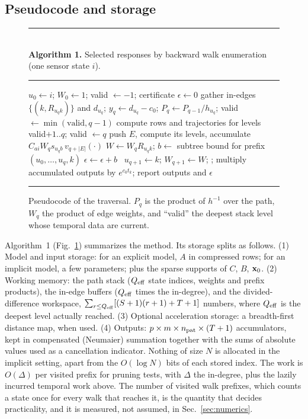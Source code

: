\subsection{Pseudocode and storage}
\begin{figure}[t]
\small
\noindent\rule{\linewidth}{0.4pt}\\[-2pt]
\textbf{Algorithm 1.} Selected responses by backward walk enumeration (one sensor state $i$).\\[-6pt]
\noindent\rule{\linewidth}{0.4pt}
\begin{algorithmic}[1]
\State $u_0\gets i$; $W_0\gets1$; valid $\gets-1$; certificate $\epsilon\gets0$
  \State gather in-edges $\{(k,R_{u_qk})\}$ and $d_{u_q}$; $y_q\gets d_{u_q}-c_0$; $P_q\gets P_{q-1}/h_{u_q}$; valid $\gets\min(\text{valid},q-1)$
     \State compute rows and trajectories for levels valid$+1..q$; valid $\gets q$
      push $E$, compute its levels, accumulate $C_{ai}W_q s_{u_qb}\,v_{q+|E|}(\cdot)$ \EndFor
  \EndIf
     \State $W\gets W_qR_{u_qk}$; $b\gets$ subtree bound for prefix $(u_0,\dots,u_q,k)$ 
      $\epsilon\gets\epsilon+b$ 
     \Else\ $u_{q+1}\gets k$; $W_{q+1}\gets W$; 
     \EndIf
  \EndFor
\EndProcedure
\State {}; multiply accumulated outputs by $e^{c_0t_k}$; report outputs and $\epsilon$
\end{algorithmic}
\noindent\rule{\linewidth}{0.4pt}
\caption{Pseudocode of the traversal. $P_q$ is the product of $h^{-1}$ over the path, $W_q$ the product of edge weights, and ``valid'' the deepest stack level whose temporal data are current.}\label{alg:walk}
\end{figure}
Algorithm~1 (Fig.~\ref{alg:walk}) summarizes the method. Its storage splits as follows. (1) Model and input storage: for an explicit model, $A$ in compressed rows; for an implicit model, a few parameters; plus the sparse supports of $C$, $B$, ${\bf x}_0$. (2) Working memory: the path stack ($Q_{\rm eff}$ state indices, weights and prefix products), the in-edge buffers ($Q_{\rm eff}$ times the in-degree), and the divided-difference workspace, $\sum_{r\le Q_{\rm eff}}[(S+1)(r+1)+T+1]$ numbers, where $Q_{\rm eff}$ is the deepest level actually reached. (3) Optional acceleration storage: a breadth-first distance map, when used. (4) Outputs: $p\times m\times n_{\rm pat}\times(T+1)$ accumulators, kept in compensated (Neumaier) summation together with the sums of absolute values used as a cancellation indicator. Nothing of size $N$ is allocated in the implicit setting, apart from the $O(\log N)$ bits of each stored index. The work is $O(\Delta)$ per visited prefix for pruning tests, with $\Delta$ the in-degree, plus the lazily incurred temporal work above. The number of visited walk prefixes, which counts a state once for every walk that reaches it, is the quantity that decides practicality, and it is measured, not assumed, in Sec.~\ref{sec:numerics}.

